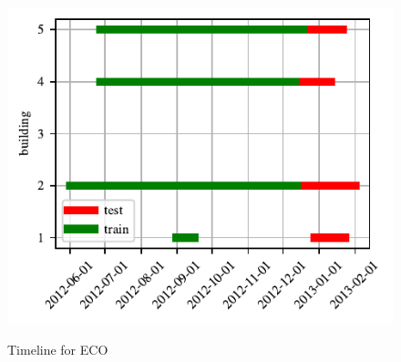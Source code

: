 \begin{figure}[H]
	\centering
	\caption{Timeline for ECO}
	\includegraphics[]{Figures/EC/eco_timeline.pdf}
	\label{fig:eco_timeline}
\end{figure}

